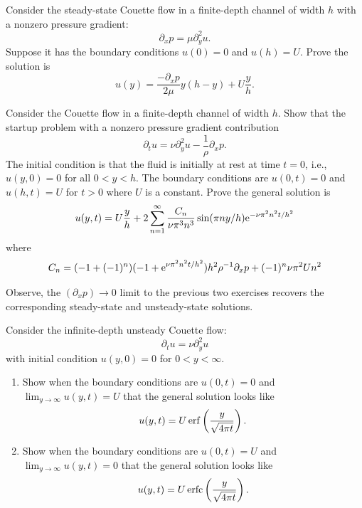\begin{framed}
\begin{xca}
Consider the steady-state Couette flow in a finite-depth channel of
width $h$ with a nonzero pressure gradient:
\begin{equation}
\partial_{x}p = \mu\partial_{y}^{2}u.
\end{equation}
Suppose it has the boundary conditions $u(0)=0$ and $u(h)=U$. Prove
the solution is
\begin{equation}
u(y) = \frac{-\partial_{x}p}{2\mu}y(h-y)+U\frac{y}{h}.
\end{equation}
\end{xca}

\begin{xca}
Consider the Couette flow in a finite-depth channel of width $h$.
Show that the startup problem with a nonzero pressure gradient contribution
\begin{equation}
\partial_{t}u = \nu\partial_{y}^{2}u-\frac{1}{\rho}\partial_{x}p.
\end{equation}
The initial condition is that the fluid is initially at rest at time
$t=0$, i.e., $u(y,0)=0$ for all $0<y<h$. The boundary conditions are
$u(0,t)=0$ and $u(h,t)=U$ for $t>0$ where $U$ is a constant. Prove the
general solution is
\begin{equation}
u(y,t) = U\frac{y}{h}+2\sum^{\infty}_{n=1}\frac{C_{n}}{\nu\pi^{3}n^{3}}%
\sin(\pi ny/h)\E^{-\nu\pi^{2}n^{2}t/h^{2}}
\end{equation}
where
\begin{equation}
C_{n}=(-1+(-1)^{n})(-1+\mathrm{e}^{\nu\pi^{2}n^{2}t/h^{2}})h^{2}\rho^{-1}\partial_{x}p+(-1)^{n}\nu\pi^{2}Un^{2}
\end{equation}
\end{xca}

\begin{remark}
Observe, the $(\partial_{x}p)\to0$ limit to the previous two exercises
recovers the corresponding steady-state and unsteady-state solutions.
\end{remark}

\begin{xca}
Consider the infinite-depth unsteady Couette flow:
\begin{equation}
\partial_{t}u=\nu\partial_{y}^{2}u
\end{equation}
with initial condition $u(y,0)=0$ for $0<y<\infty$.
\begin{enumerate}
\item Show when the boundary conditions are $u(0,t)=0$ and $\lim_{y\to\infty}u(y,t)=U$ that the
general solution looks like
\begin{equation}
u(y,t) = U\operatorname{erf}\left(\frac{y}{\sqrt{4\pi t}}\right).
\end{equation}
\item Show when the boundary conditions are $u(0,t)=U$ and $\lim_{y\to\infty}u(y,t)=0$ that the
general solution looks like
\begin{equation}
u(y,t) = U\operatorname{erfc}\left(\frac{y}{\sqrt{4\pi t}}\right).
\end{equation}
\end{enumerate}
\end{xca}


\end{framed}
